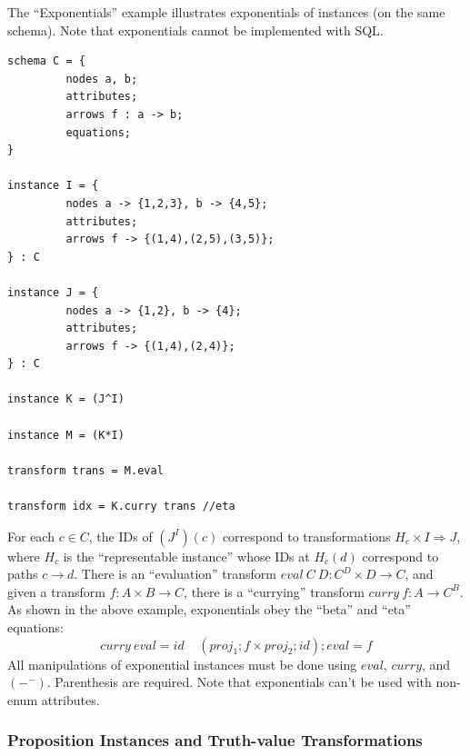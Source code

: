 \documentclass[12pt]{article}
\begin{document}
The ``Exponentials'' example illustrates exponentials of instances (on the same schema).  Note that exponentials cannot be implemented with SQL.
\begin{verbatim}
schema C = {
         nodes a, b;
         attributes;
         arrows f : a -> b;
         equations;
}

instance I = {
         nodes a -> {1,2,3}, b -> {4,5};
         attributes;
         arrows f -> {(1,4),(2,5),(3,5)};
} : C

instance J = {
         nodes a -> {1,2}, b -> {4};
         attributes;
         arrows f -> {(1,4),(2,4)};
} : C

instance K = (J^I)

instance M = (K*I) 

transform trans = M.eval

transform idx = K.curry trans //eta
\end{verbatim}
For each $c \in C$, the IDs of $(J^I)(c)$ correspond to transformations $H_c \times I \Rightarrow J$, where $H_c$ is the ``representable instance'' whose IDs at $H_c(d)$ correspond to paths $c \to d$.  There is an ``evaluation'' transform $eval \ C \ D : C^D \times D \to C$, and given a transform $f : A \times B \to C$, there is a ``currying'' transform $curry \ f : A \to C^B$.  As shown in the above example, exponentials obey the ``beta'' and ``eta'' equations:
$$
curry \ eval = id \ \ \ \ \ (proj_1 ; f \times proj_2 ; id) ; eval = f
$$
All manipulations of exponential instances must be done using $eval$, $curry$, and $(-^-)$.  Parenthesis are required.  Note that exponentials can't be used with non-enum attributes.

 \subsubsection{Proposition Instances and Truth-value Transformations}
 
\end{document}
